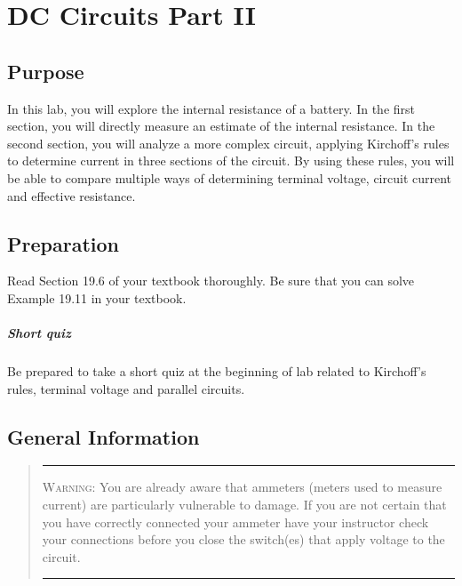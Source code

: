
\chapter {DC Circuits Part II}

\section {Purpose}  
In this lab, you will explore the internal resistance of a battery.  In the first section, you will directly measure an estimate of the internal resistance.  In the second section, you will analyze a more complex circuit, applying Kirchoff's rules to determine current in three sections of the circuit.  By using these rules, you will be able to compare multiple ways of determining terminal voltage, circuit current and effective resistance.

\section {Preparation} Read Section 19.6 of your textbook thoroughly.  Be sure that you can solve Example 19.11 in your textbook.

\paragraph {Short quiz}  Be prepared to take a short quiz at the beginning of lab related to Kirchoff's rules, terminal voltage and parallel circuits.

\section {General Information}
\begin{quote}\hrule
\textsc{Warning:}  You are already aware that ammeters (meters used to measure current) are particularly vulnerable to damage.  If you are not certain that you have correctly connected your ammeter have your instructor check your connections before you close the switch(es) that apply voltage to the circuit.
\hrule
\end{quote}

